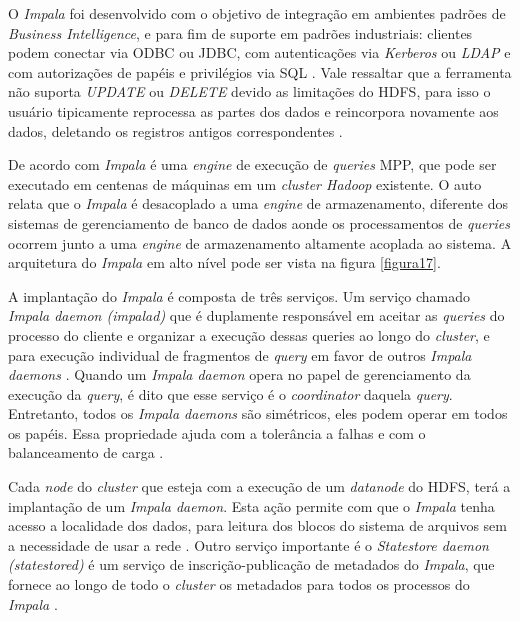             O \textit{Impala} foi desenvolvido com o objetivo de integração em ambientes padrões de \textit{Business Intelligence},
            e para fim de suporte em padrões industriais: clientes podem conectar via ODBC ou JDBC, com autenticações via
            \textit{Kerberos} ou \textit{LDAP} e com autorizações de papéis e privilégios via SQL \cite{russell2013}. Vale ressaltar
            que a ferramenta não suporta \textit{UPDATE} ou \textit{DELETE} devido as limitações do HDFS, para isso o usuário
            tipicamente reprocessa as partes dos dados e reincorpora novamente aos dados, deletando os registros antigos
            correspondentes \cite{bittorf2015}.

            De acordo com  \textit{Impala} é uma \textit{engine} de execução de \textit{queries} MPP,
            que pode ser executado em centenas de máquinas em um \textit{cluster Hadoop} existente. O auto 
            relata que o \textit{Impala} é desacoplado a uma \textit{engine} de armazenamento, diferente dos sistemas de gerenciamento
            de banco de dados aonde os processamentos de \textit{queries} ocorrem junto a uma \textit{engine} de armazenamento
            altamente acoplada ao sistema. A arquitetura do \textit{Impala} em alto nível pode ser vista na figura \ref{figura17}.

            A implantação do \textit{Impala} é composta de três serviços. Um serviço chamado \textit{Impala daemon (impalad)}
            que é duplamente responsável em aceitar as \textit{queries} do processo do cliente e organizar a execução dessas
            queries ao longo do \textit{cluster}, e para execução individual de fragmentos de \textit{query} em favor de outros
            \textit{Impala daemons} \cite{bittorf2015}. Quando um \textit{Impala daemon} opera no papel de gerenciamento da
            execução da \textit{query}, é dito que esse serviço é o \textit{coordinator} daquela \textit{query}. Entretanto, todos
            os \textit{Impala daemons} são simétricos, eles podem operar em todos os papéis. Essa propriedade ajuda com a
            tolerância a falhas e com o balanceamento de carga \cite{bittorf2015}.

            Cada \textit{node} do \textit{cluster} que esteja com a execução de um \textit{datanode} do HDFS, terá a
            implantação de um \textit{Impala daemon}.  Esta ação permite com que o \textit{Impala} tenha acesso a localidade
            dos dados, para leitura dos blocos do sistema de arquivos sem a necessidade de usar a rede \cite{bittorf2015}. Outro
            serviço importante é o \textit{Statestore daemon (statestored)} é um serviço de inscrição-publicação de metadados
            do \textit{Impala}, que fornece ao longo de todo o \textit{cluster} os metadados para todos os processos do \textit{Impala}
            \cite{russell2013}.

